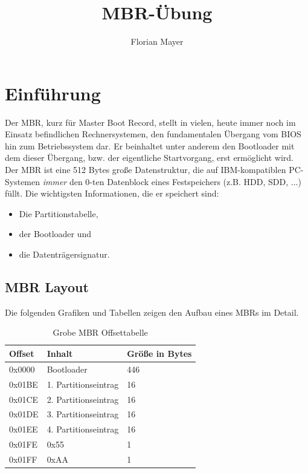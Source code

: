 \documentclass[11pt,a4paper]{article}
\begin{document}
\title{\color{black} MBR-Übung}
\author{\color{darkblue} Florian Mayer}
\maketitle

\tableofcontents

\section{Einführung}
Der MBR, kurz für Master Boot Record, stellt in vielen, heute
immer noch im Einsatz befindlichen Rechnersystemen, den fundamentalen
Übergang vom BIOS hin zum Betriebssystem dar. Er beinhaltet unter anderem
den Bootloader mit dem dieser Übergang, bzw. der eigentliche Startvorgang,
erst ermöglicht wird. Der MBR ist eine 512 Bytes
große Datenstruktur, die auf IBM-kompatiblen PC-Systemen \emph{immer}
den 0-ten Datenblock eines Festspeichers (z.B. HDD, SDD, ...) füllt.
Die wichtigsten Informationen, die er speichert sind:
\begin{itemize}
	\item Die Partitionstabelle,
	\item der Bootloader und
	\item die Datenträgersignatur.
\end{itemize}

\subsection{MBR Layout}
Die folgenden Grafiken und Tabellen zeigen den Aufbau eines MBRs im Detail.

\begin{table}[h]
	\begin{center}
		
		\begin{tabular}[c]{  l | l | l }
		\cellcolor{grey} Offset & \cellcolor{grey} Inhalt & \cellcolor{grey} Größe in Bytes \\ \hline
		0x0000 & Bootloader & 446\\ \hline
		0x01BE & 1. Partitionseintrag & 16 \\ \hline
		0x01CE & 2. Partitionseintrag & 16 \\ \hline
		0x01DE & 3. Partitionseintrag & 16 \\ \hline
		0x01EE & 4. Partitionseintrag & 16 \\ \hline
		0x01FE & 0x55 & 1\\ \hline
		0x01FF & 0xAA & 1\\
		\end{tabular}
	\end{center}
	
	\caption{Grobe MBR Offsettabelle}
	\label{tab:mbr_layout_tbl}
\end{table}
\end{document}
